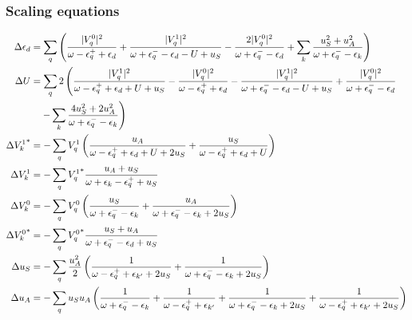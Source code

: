 \documentclass[14pt]{extarticle}
\numberwithin{equation}{section}
\begin{document}
{\subsubsection{Scaling equations}
\begin{align*}
	\Delta \epsilon_d &= \sum_q \left({\frac{|V_q^0|^2}{\omega - \epsilon_q^+ + \epsilon_d } + \frac{|V_q^1|^2}{\omega + \epsilon^-_q - \epsilon_d  - U + u_S} - \frac{2|V_q^0|^2}{\omega + \epsilon^-_q - \epsilon_d} + \sum_k\frac{u_S^2 + u_A^2}{\omega + \epsilon_q^- - \epsilon_k}}\right)\\
	\Delta U &= \sum_q 2\left(\frac{|V_q^1|^2}{\omega - \epsilon_q^+ + \epsilon_d + U + u_S} - \frac{|V_q^0|^2}{\omega - \epsilon_q^+ + \epsilon_d} - \frac{|V_q^1|^2}{\omega + \epsilon^-_q - \epsilon_d  - U + u_S} +\frac{|V_q^0|^2}{\omega + \epsilon^-_q - \epsilon_d} \right.\\
		 &\quad\left.-\sum_k \frac{4u_S^2 + 2u_A^2}{\omega + \epsilon_q^- - \epsilon_k}\right)\\
	\Delta {V_k^1}^* &=-\sum_q V_q^1\left({\frac{u_A}{\omega - \epsilon_q^+ + \epsilon_d + U + 2u_S} + \frac{u_S}{\omega - \epsilon_q^+ + \epsilon_d + U}}\right) \\
\Delta {V_k^1} &= -\sum_q  {V_q^1}^*\frac{u_A + u_S}{\omega + \epsilon_k - \epsilon_q^+ + u_S}\\
\Delta V_k^0 &= -\sum_q V_q^0\left({\frac{u_S}{\omega + \epsilon_q^- - \epsilon_{k}} + \frac{u_A}{\omega + \epsilon_q^- - \epsilon_{k} + 2u_S}}\right)\\
\Delta {V_k^0}^* &=-\sum_q {V_q^0}^* \frac{u_S + u_A}{\omega + \epsilon_q^- - \epsilon_d + u_S}\\
\Delta u_S &= -\sum_q \frac{u_A^2}{2}\left({\frac{1}{\omega - \epsilon_q^+ + \epsilon_{k^\prime}+2u_S} + \frac{1}{\omega + \epsilon_q^- - \epsilon_k + 2u_S}}\right)\\
\Delta u_A &= - \sum_q u_S u_A \left({\frac{1}{\omega + \epsilon_q^-  - \epsilon_{k}} + \frac{1}{\omega - \epsilon_q^+  + \epsilon_{k^\prime}} + \frac{1}{\omega + \epsilon_q^-  - \epsilon_{k} + 2u_S} + \frac{1}{\omega - \epsilon_q^+  + \epsilon_{k^\prime} + 2u_S}}\right)
\end{align*}
}
\end{document}
